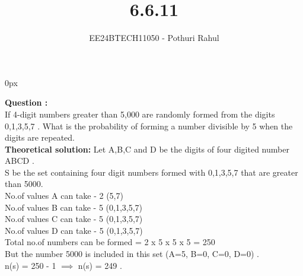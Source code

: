 \documentclass[journal]{IEEEtran}
\begin{document}

\vspace{3cm}
\parindent 0px

\title{6.6.11}
\author{EE24BTECH11050 - Pothuri Rahul}
{\let\newpage\relax\maketitle}

\renewcommand{\thefigure}{\theenumi}
\renewcommand{\thetable}{\theenumi}
\setlength{\intextsep}{10pt} %


\renewcommand{\thetable}{\theenumi}

\textbf{Question :} \\ 
If 4-digit numbers greater than 5,000 are randomly formed from the digits 0,1,3,5,7 . What is the probability of forming a number divisible by 5 when the digits are repeated.
\solution \\
\textbf{Theoretical solution:}
Let A,B,C and D be the digits of four digited number ABCD . \\
S be the set containing four digit numbers formed with 0,1,3,5,7 that are greater than 5000. \\
No.of values A can take - 2 (5,7) \\
No.of values B can take - 5 (0,1,3,5,7) \\
No.of values C can take - 5 (0,1,3,5,7) \\
No.of values D can take - 5 (0,1,3,5,7) \\
Total no.of numbers can be formed = 2 x 5 x 5 x 5 = 250 \\
But the number 5000 is included in this set (A=5, B=0, C=0, D=0) . \\
n(s) = 250 - 1 $\implies$ n(s) = 249 .
\end{document}
